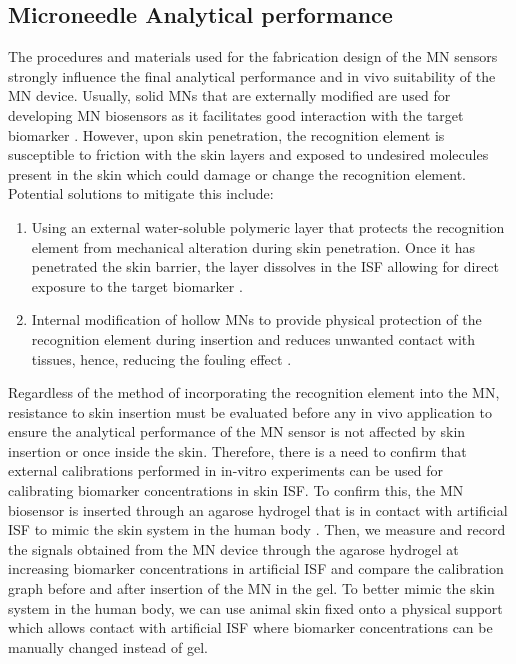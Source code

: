 \begin{appendices}
\subsection{Microneedle Analytical performance}
The procedures and materials used for the fabrication design of the MN sensors strongly influence the final analytical performance and in vivo suitability of the MN device. Usually, solid MNs that are externally modified are used for developing MN biosensors as it facilitates good interaction with the target biomarker \cite{calio2016polymeric,bollella2019minimally}. However, upon skin penetration, the recognition element is susceptible to friction with the skin layers and exposed to undesired molecules present in the skin which could damage or change the recognition element. Potential solutions to mitigate this include: 
\begin{enumerate}
    \item Using an external water-soluble polymeric layer that protects the recognition element from mechanical alteration during skin penetration. Once it has penetrated the skin barrier, the layer dissolves in the ISF allowing for direct exposure to the target biomarker \cite{jin2019reduced}.
    \item Internal modification of hollow MNs to provide physical protection of the recognition element during insertion and reduces unwanted contact with tissues, hence, reducing the fouling effect \cite{zhao2020silk,miller2012multiplexed}.
\end{enumerate}
Regardless of the method of incorporating the recognition element into the MN, resistance to skin insertion must be evaluated before any in vivo application to ensure the analytical performance of the MN sensor is not affected by skin insertion or once inside the skin. 
Therefore, there is a need to confirm that external calibrations performed in in-vitro experiments can be used for calibrating biomarker concentrations in skin ISF. To confirm this, the MN biosensor is inserted through an agarose hydrogel that is in contact with artificial ISF to mimic the skin system in the human body \cite{bollella2019minimally}. Then, we measure and record the signals obtained from the MN device through the agarose hydrogel at increasing biomarker concentrations in artificial ISF and compare the calibration graph before and after insertion of the MN in the gel. To better mimic the skin system in the human body, we can use animal skin fixed onto a physical support which allows contact with artificial ISF where biomarker concentrations can be manually changed instead of gel. 

\end{appendices}
